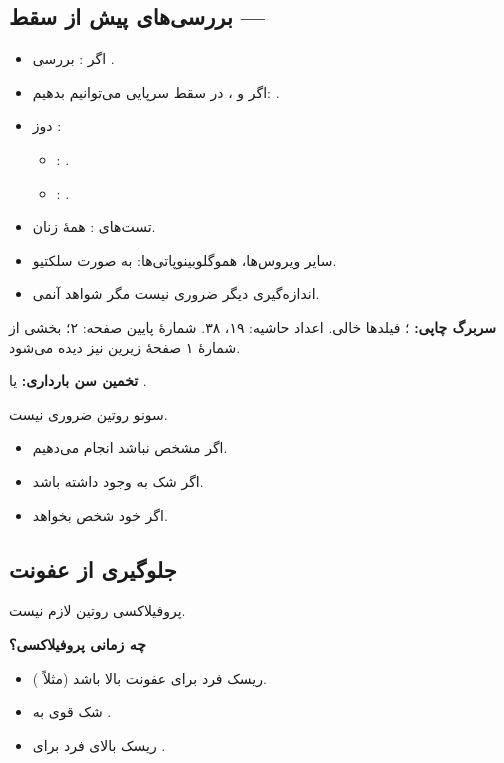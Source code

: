 \documentclass[12pt,a4paper]{article}
\begin{document}
\subsection*{بررسی‌های پیش از سقط — }
\begin{itemize}
\item اگر : بررسی .
\item اگر  و ، در سقط سرپایی می‌توانیم بدهیم: .
\item دوز :
  \begin{itemize}
  \item {}: .
  \item {}: .
  \end{itemize}
\item تست‌های : همهٔ زنان.
\item سایر ویروس‌ها، هموگلوبینوپاتی‌ها: به صورت سلکتیو.
\item اندازه‌گیری  دیگر ضروری نیست مگر شواهد آنمی.
\end{itemize}

\textbf{سربرگ چاپی:} ؛ فیلدها خالی. اعداد حاشیه: ۱۹، ۳۸. شمارهٔ پایین صفحه: ۲؛ بخشی از شمارهٔ ۱ صفحهٔ زیرین نیز دیده می‌شود.

\textbf{تخمین سن بارداری:}  یا .

سونو روتین ضروری نیست.
\begin{itemize}
\item اگر  مشخص نباشد انجام می‌دهیم.
\item اگر شک به  وجود داشته باشد.
\item اگر خود شخص بخواهد.
\end{itemize}

\subsection*{جلوگیری از عفونت}
پروفیلاکسی  روتین لازم نیست.

\textbf{چه زمانی پروفیلاکسی؟}
\begin{itemize}
\item ریسک فرد برای عفونت بالا باشد (مثلاً ).
\item شک قوی به .
\item ریسک بالای فرد برای .
\end{itemize}
\end{document}
